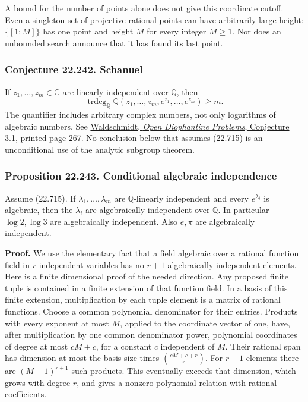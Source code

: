 \documentclass[
  11pt,
  a4paper,
]{article}
\begin{document}
A bound for the number of points alone does not give this coordinate
cutoff. Even a singleton set of projective rational points can have
arbitrarily large height: \(\{[1:M]\}\) has one point and height \(M\)
for every integer \(M\ge1\). Nor does an unbounded search announce that
it has found its last point.

\subsubsection{Conjecture 22.242.
Schanuel}\label{conjecture-22.242.-schanuel}

If \(z_1,\ldots,z_m\in\mathbb C\) are linearly independent over
\(\mathbb Q\), then \[
 \operatorname{trdeg}_{\mathbb Q}
 \mathbb Q(z_1,\ldots,z_m,e^{z_1},\ldots,e^{z_m})\ge m.
 \tag{22.715}
\] The quantifier includes arbitrary complex numbers, not only
logarithms of algebraic numbers. See
\href{https://webusers.imj-prg.fr/~michel.waldschmidt/articles/pdf/odp.pdf}{Waldschmidt,
\emph{Open Diophantine Problems}, Conjecture 3.1, printed page 267}. No
conclusion below that assumes (22.715) is an unconditional use of the
analytic subgroup theorem.

\subsubsection{Proposition 22.243. Conditional algebraic
independence}\label{proposition-22.243.-conditional-algebraic-independence}

Assume (22.715). If \(\lambda_1,\ldots,\lambda_m\) are
\(\mathbb Q\)-linearly independent and every \(e^{\lambda_i}\) is
algebraic, then the \(\lambda_i\) are algebraically independent over
\(\overline{\mathbb Q}\). In particular \(\log2,\log3\) are
algebraically independent. Also \(e,\pi\) are algebraically independent.

\textbf{Proof.} We use the elementary fact that a field algebraic over a
rational function field in \(r\) independent variables has no \(r+1\)
algebraically independent elements. Here is a finite dimensional proof
of the needed direction. Any proposed finite tuple is contained in a
finite extension of that function field. In a basis of this finite
extension, multiplication by each tuple element is a matrix of rational
functions. Choose a common polynomial denominator for their entries.
Products with every exponent at most \(M\), applied to the coordinate
vector of one, have, after multiplication by one common denominator
power, polynomial coordinates of degree at most \(cM+c\), for a constant
\(c\) independent of \(M\). Their rational span has dimension at most
the basis size times \(\binom{cM+c+r}{r}\). For \(r+1\) elements there
are \((M+1)^{r+1}\) such products. This eventually exceeds that
dimension, which grows with degree \(r\), and gives a nonzero polynomial
relation with rational coefficients.
\end{document}
